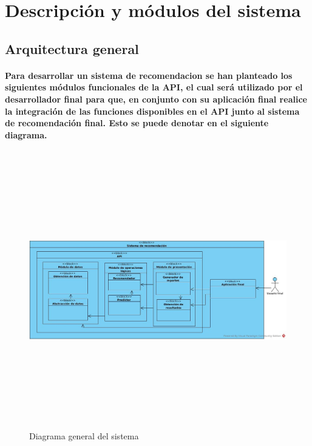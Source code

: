 \section {Descripción y módulos del sistema}

  \subsection{Arquitectura general}
    \paragraph{Para desarrollar un sistema de recomendacion se han planteado los siguientes módulos funcionales de la API, el cual será utilizado por el desarrollador final para que, en conjunto con su aplicación final realice la integración de las funciones disponibles en el API junto al sistema de recomendación final. Esto se puede denotar en el siguiente diagrama.}

\newpage
    \begin{landscape}
      \begin{figure}[h!]
      \centering
      \includegraphics[width=22.5cm,height=12cm]{./images/architecture_diagram.jpg}
      \caption{Diagrama general del sistema}
    \end{figure}
    \end{landscape}
  \newpage

